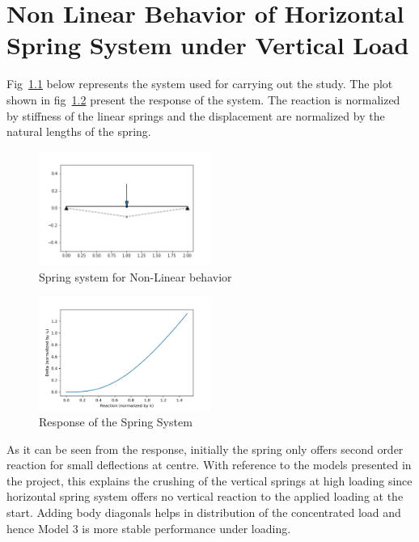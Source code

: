 \appendix
\chapter{Non Linear Behavior of Horizontal Spring System under Vertical Load}

Fig~\ref{fig:Non_linear_system} below represents the system used for carrying out the study. The plot shown in fig~\ref{fig:Non_linear_system_plot} present the response of the system. The reaction is normalized by stiffness of the linear springs and the displacement are normalized by the natural lengths of the spring.

\begin{figure}[!htbp]
    \centering
    \includegraphics[width = 0.5\textwidth]{Figures/non_linear_spring_behavior.png}
    \caption{Spring system for Non-Linear behavior}
    \label{fig:Non_linear_system}
\end{figure}

\begin{figure}[!htbp]
    \centering
    \includegraphics[width = 0.5\textwidth]{Figures/spring_response.png}
    \caption{Response of the Spring System}
    \label{fig:Non_linear_system_plot}
\end{figure}

As it can be seen from the response, initially the spring only offers second order reaction for small deflections at centre. With reference to the models presented in the project, this explains the crushing of the vertical springs at high loading since horizontal spring system offers no vertical reaction to the applied loading at the start. Adding body diagonals helps in distribution of the concentrated load and hence Model 3 is more stable performance under loading. 

